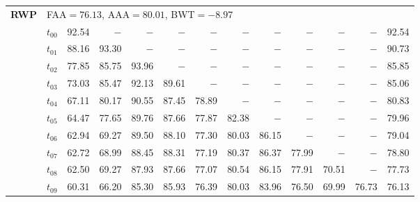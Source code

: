 \begin{table}[ht]
\begin{tabular}{@{}l l r r r r r r r r r r r@{}}
\midrule
\multirow{11}{*}{\textbf{RWP}} & \multicolumn{12}{l}{\quad\small FAA$=76.13$,\; AAA$=80.01$,\; BWT$=-8.97$} \\
 & $t_{00}$ & 92.54 & $-$ & $-$ & $-$ & $-$ & $-$ & $-$ & $-$ & $-$ & $-$ & 92.54 \\
 & $t_{01}$ & 88.16 & 93.30 & $-$ & $-$ & $-$ & $-$ & $-$ & $-$ & $-$ & $-$ & 90.73 \\
 & $t_{02}$ & 77.85 & 85.75 & 93.96 & $-$ & $-$ & $-$ & $-$ & $-$ & $-$ & $-$ & 85.85 \\
 & $t_{03}$ & 73.03 & 85.47 & 92.13 & 89.61 & $-$ & $-$ & $-$ & $-$ & $-$ & $-$ & 85.06 \\
 & $t_{04}$ & 67.11 & 80.17 & 90.55 & 87.45 & 78.89 & $-$ & $-$ & $-$ & $-$ & $-$ & 80.83 \\
 & $t_{05}$ & 64.47 & 77.65 & 89.76 & 87.66 & 77.87 & 82.38 & $-$ & $-$ & $-$ & $-$ & 79.96 \\
 & $t_{06}$ & 62.94 & 69.27 & 89.50 & 88.10 & 77.30 & 80.03 & 86.15 & $-$ & $-$ & $-$ & 79.04 \\
 & $t_{07}$ & 62.72 & 68.99 & 88.45 & 88.31 & 77.19 & 80.37 & 86.37 & 77.99 & $-$ & $-$ & 78.80 \\
 & $t_{08}$ & 62.50 & 69.27 & 87.93 & 87.66 & 77.07 & 80.54 & 86.15 & 77.91 & 70.51 & $-$ & 77.73 \\
 & $t_{09}$ & 60.31 & 66.20 & 85.30 & 85.93 & 76.39 & 80.03 & 83.96 & 76.50 & 69.99 & 76.73 & 76.13 \\
\bottomrule
\end{tabular}
\end{table}

